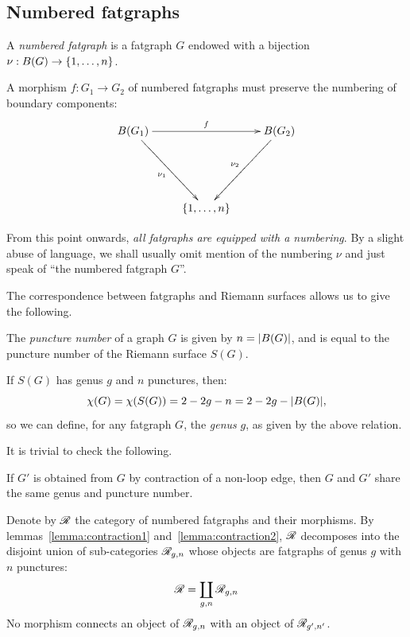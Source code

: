 \subsection{Numbered fatgraphs}
\label{sec:numbered-rg}

\begin{definition}
  A \emph{numbered fatgraph} is a fatgraph $G$ endowed with a
  bijection $\nu: B(G) \to \{1,\ldots, n\}$.

  A morphism $f: G_1 \to G_2$ of numbered fatgraphs must preserve the
  numbering of boundary components:
  \begin{equation*}
    \xymatrix{%
      \Holes{G_1} &  & \Holes{G_2}
      \\
      & &
      \\
      & \{ 1, \ldots, n \} &
      \ar^{f} "1,1";"1,3"
      \ar_{\nu_1} "1,1";"3,2"
      \ar_{\nu_2} "1,3";"3,2"
    }%
  \end{equation*}
\end{definition}
From this point onwards, \emph{all fatgraphs are equipped with a
  numbering}. By a slight abuse of language, we shall usually omit
mention of the numbering $\nu$ and just speak of ``the numbered
fatgraph $G$''.

The correspondence between fatgraphs and Riemann surfaces allows
us to give the following.
\begin{definition}\label{dfn:rg-genus}
  The \emph{puncture number} of a graph $G$ is given by $n =
  \lvert B(G)\rvert$, and is equal to the puncture number of the
  Riemann surface $S(G)$.

  If $S(G)$ has genus $g$ and $n$ punctures, then:
  \begin{equation}
    \label{eq:euler-characteristics-of-fatgraphs}
    \chi(G) = \chi(S(G)) = 2 - 2g - n = 2 - 2g - \lvert B(G)\rvert,
  \end{equation}
  so we can define, for any fatgraph $G$, the \emph{genus} $g$, as
  given by the above relation.
\end{definition}
It is trivial to check the following.
\begin{lemma}\label{lemma:contraction2}
  If $G'$ is obtained from $G$ by contraction of a non-loop edge,
  then $G$ and $G'$ share the same genus and puncture number.
\end{lemma}
Denote by $\mathscr{R}$ the category of numbered fatgraphs and their
morphisms.  By lemmas~\ref{lemma:contraction1}
and~\ref{lemma:contraction2}, $\mathscr{R}$ decomposes into the disjoint union
of sub-categories $\mathscr{R}_{g,n}$ whose objects are fatgraphs of genus
$g$ with $n$ punctures:
\begin{equation*}
  \mathscr{R} = \coprod_{g,n} \mathscr{R}_{g,n}
\end{equation*}
No morphism connects an object of $\mathscr{R}_{g,n}$ with an object of
$\mathscr{R}_{g',n'}$.


